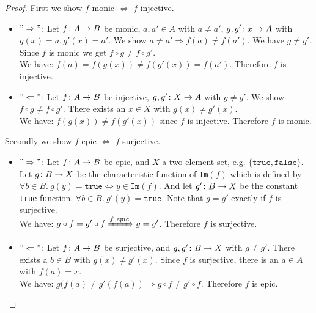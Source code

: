 \begin{proof}
  First we show $f$ monic $\Leftrightarrow$ $f$ injective.
  \begin{itemize}
  \item $"\Rightarrow"$: Let $f \from A \to B$ be monic, $a, a' \in A$ with $a \neq a'$, $g, g' \from {x} \to A$ with $g(x) = a, g'(x) = a'$.
    We show $a \neq a' \Rightarrow f(a) \neq f(a')$.
    We have $g \neq g'$.
    Since $f$ is monic we get $f \circ g \neq f \circ g'$.\\
    We have: $f(a) = f(g(x)) \neq f(g'(x)) = f(a')$. Therefore $f$ is injective.
  \item $"\Leftarrow"$: Let $f \from A \to B$ be injective, $g, g' \from X \to A$ with $g \neq g'$.
    We show $f \circ g \neq f \circ g'$.
    There exists an $x \in X$ with $g(x) \neq g'(x)$.\\
    We have: $f(g(x)) \neq f(g'(x))$ since $f$ is injective.
    Therefore $f$ is monic.
  \end{itemize}
  Secondly we show $f$ epic $\Leftrightarrow$ $f$ surjective.
  \begin{itemize}
  \item $"\Rightarrow"$: Let $f \from A \to B$ be epic, and $X$ a two element set, e.g. $\{ \texttt{true}, \texttt{false}\}$.
    Let $g \from B \to X$ be the characteristic function of \texttt{Im}$(f)$ which is defined by
    $\forall b \in B. \ g(y) = \texttt{true}
    \Leftrightarrow y \in \texttt{Im}(f)$.
    And let $g' \from B \to X$ be the constant \texttt{true}-function.
    $\forall b \in B. \ g'(y) = \texttt{true}$.
    Note that $g = g'$ exactly if $f$ is surjective.\\
    We have: $g \of f = g' \of f \xRightarrow{f \ epic} g = g'$.
    Therefore $f$ is surjective.
  \item $"\Leftarrow"$: Let $f \from A \to B$ be surjective, and $g, g' \from B \to X$ with $g \neq g'$.
    There exists a $b \in B$ with $g(x) \neq g'(x)$.
    Since $f$ is surjective, there is an $a \in A$ with $f(a) = x$.\\
    We have: $g(f(a) \neq g'(f(a)) \Rightarrow g \circ f \neq g' \circ f$.
    Therefore $f$ is epic.
  \end{itemize}
\end{proof}

